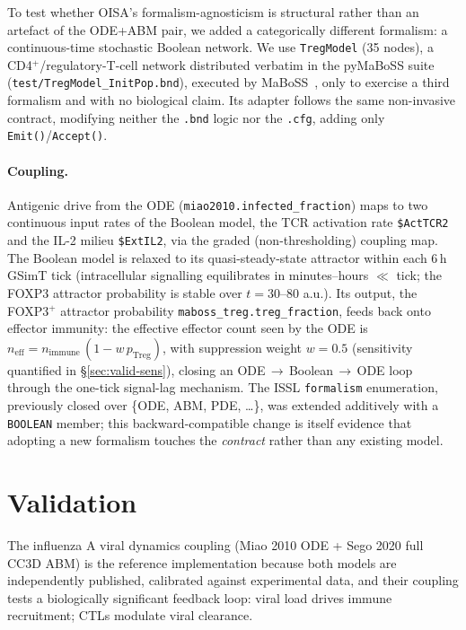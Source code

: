 \documentclass[conference,letterpaper,10pt]{IEEEtran}
\begin{document}
To test whether OISA's formalism-agnosticism is structural rather than an
artefact of the ODE+ABM pair, we added a categorically different formalism:
a continuous-time stochastic Boolean network. We use \texttt{TregModel} (35
nodes), a CD4$^+$/regulatory-T-cell network distributed verbatim in the
pyMaBoSS suite~\cite{pymaboss} (\texttt{test/TregModel\_InitPop.bnd}),
executed by MaBoSS~\cite{stoll2017maboss}, only to exercise a third
formalism and with no biological claim. Its adapter follows the same
non-invasive contract, modifying neither the \texttt{.bnd} logic nor the
\texttt{.cfg}, adding only \texttt{Emit()}/\texttt{Accept()}.

\paragraph{Coupling.} Antigenic drive from the ODE
(\texttt{miao2010.infected\_fraction}) maps to two continuous input rates
of the Boolean model, the TCR activation rate \texttt{\$ActTCR2} and the
IL-2 milieu \texttt{\$ExtIL2}, via the graded (non-thresholding) coupling
map. The Boolean model is relaxed to its quasi-steady-state attractor within
each 6\,h GSimT tick (intracellular signalling equilibrates in
minutes--hours $\ll$ tick; the FOXP3 attractor probability is stable over
$t=30$--$80$ a.u.). Its output, the FOXP3$^+$ attractor probability
\texttt{maboss\_treg.treg\_fraction}, feeds back onto effector immunity: the
effective effector count seen by the ODE is
$n_{\text{eff}} = n_{\text{immune}}\,(1-w\,p_{\text{Treg}})$, with
suppression weight $w=0.5$ (sensitivity quantified in
\S\ref{sec:valid-sens}), closing an ODE\,$\to$\,Boolean\,$\to$\,ODE loop
through the one-tick signal-lag mechanism. The ISSL \texttt{formalism}
enumeration, previously closed over \{ODE, ABM, PDE, \dots\}, was extended
additively with a \texttt{BOOLEAN} member; this backward-compatible change
is itself evidence that adopting a new formalism touches the \emph{contract}
rather than any existing model.

\section{Validation}\label{sec:validation}

The influenza A viral dynamics coupling (Miao 2010 ODE + Sego 2020 full CC3D
ABM) is the reference implementation because both models are independently
published, calibrated against experimental data, and their coupling tests a
biologically significant feedback loop: viral load drives immune
recruitment; CTLs modulate viral clearance.
\end{document}
